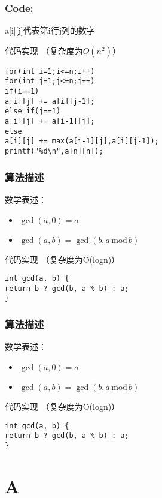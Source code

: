\documentclass{beamer}
\begin{document}
\begin{frame}[fragile]
\frametitle{Code:}
a[i][j]代表第i行j列的数字
\begin{block}{代码实现  （复杂度为$O(n^2)$）}
\begin{lstlisting}
for(int i=1;i<=n;i++)
for(int j=1;j<=n;j++)
if(i==1)    
a[i][j] += a[i][j-1];
else if(j==1)
a[i][j] += a[i-1][j];
else
a[i][j] += max(a[i-1][j],a[i][j-1]);
printf("%d\n",a[n][n]);
\end{lstlisting}
\end{block}
\end{frame}
\textbf{}

\begin{frame}[fragile]
\frametitle{算法描述}
数学表述：
\begin{itemize}
\item ${\displaystyle \gcd(a,0)=a}$
\item ${\displaystyle \gcd(a,b)=\gcd(b,a\,\mathrm {mod} \,b)} $
\end{itemize}
\begin{block}{代码实现  （复杂度为O(logn)）}
\begin{lstlisting}
int gcd(a, b) {
return b ? gcd(b, a % b) : a;
}
\end{lstlisting}
\end{block}
\end{frame}


\begin{frame}[fragile]
\frametitle{算法描述}
数学表述：
\begin{itemize}
\item ${\displaystyle \gcd(a,0)=a}$
\item ${\displaystyle \gcd(a,b)=\gcd(b,a\,\mathrm {mod} \,b)} $
\end{itemize}
\begin{block}{代码实现  （复杂度为O(logn)）}
\begin{lstlisting}
int gcd(a, b) {
return b ? gcd(b, a % b) : a;
}
\end{lstlisting}
\end{block}
\end{frame}




\section{A}
\end{document}
